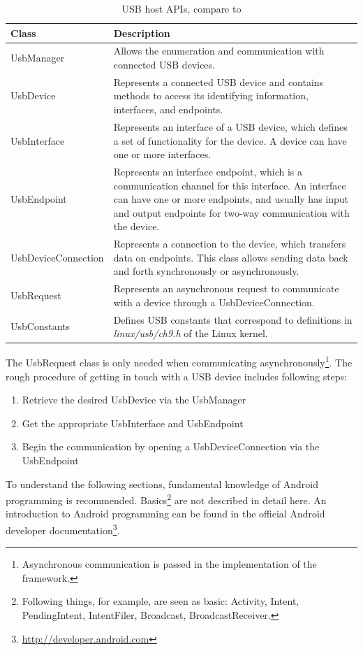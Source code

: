 \begin{table}[ht]
\caption{USB host APIs, compare to \cite{android_usb_host}}
\centering
\begin{tabular}{|l|p{10cm}|}
\hline\hline
\textbf{Class} & \textbf{Description} \\ \hline
UsbManager & Allows the enumeration and communication with connected USB devices. \\ \hline
UsbDevice & Represents a connected USB device and contains methods to access its identifying information, interfaces, and endpoints. \\ \hline
UsbInterface & Represents an interface of a USB device, which defines a set of functionality for the device. A device can have one or more interfaces. \\ \hline
UsbEndpoint & Represents an interface endpoint, which is a communication channel for this interface. An interface can have one or more endpoints, and usually has input and output endpoints for two-way communication with the device. \\ \hline
UsbDeviceConnection & Represents a connection to the device, which transfers data on endpoints. This class allows sending data back and forth synchronously or asynchronously. \\ \hline
UsbRequest & Represents an asynchronous request to communicate with a device through a UsbDeviceConnection. \\ \hline
UsbConstants & Defines USB constants that correspond to definitions in \textit{linux/usb/ch9.h} of the Linux kernel. \\ \hline
\end{tabular}
\label{table:host_api}
\end{table}

The UsbRequest class is only needed when communicating asynchronously\footnote{Asynchronous communication is passed in the implementation of the framework.}. The rough procedure of getting in touch with a USB device includes following steps:

\begin{enumerate}
\item Retrieve the desired UsbDevice via the UsbManager
\item Get the appropriate UsbInterface and UsbEndpoint
\item Begin the communication by opening a UsbDeviceConnection via the UsbEndpoint
\end{enumerate}

To understand the following sections, fundamental knowledge of Android programming is recommended. Basics\footnote{Following things, for example, are seen as basic: Activity, Intent, PendingIntent, IntentFiler, Broadcast, BroadcastReceiver.} are not described in detail here. An introduction to Android programming can be found in the official Android developer documentation\footnote{\url{http://developer.android.com}}.

